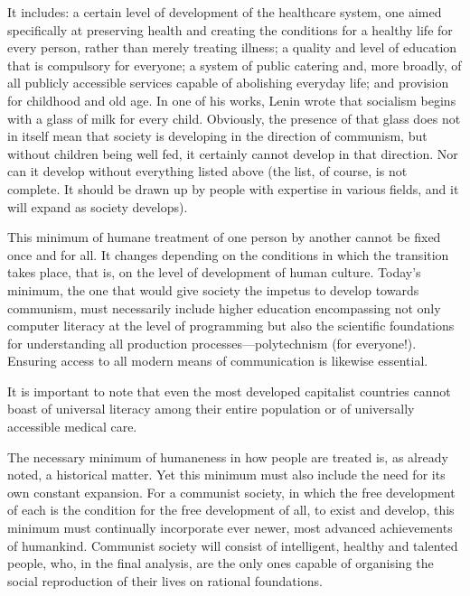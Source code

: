 \documentclass[../main]{subfiles}
\begin{document}
It includes: a certain level of development of the healthcare system, one aimed specifically at preserving health and creating the conditions for a healthy life for every person, rather than merely treating illness; a quality and level of education that is compulsory for everyone; a system of public catering and, more broadly, of all publicly accessible services capable of abolishing everyday life; and provision for childhood and old age. In one of his works, Lenin wrote that socialism begins with a glass of milk for every child. Obviously, the presence of that glass does not in itself mean that society is developing in the direction of communism, but without children being well fed, it certainly cannot develop in that direction. Nor can it develop without everything listed above (the list, of course, is not complete. It should be drawn up by people with expertise in various fields, and it will expand as society develops).

This minimum of humane treatment of one person by another cannot be fixed once and for all. It changes depending on the conditions in which the transition takes place, that is, on the level of development of human culture. Today’s minimum, the one that would give society the impetus to develop towards communism, must necessarily include higher education encompassing not only computer literacy at the level of programming but also the scientific foundations for understanding all production processes—polytechnism (for everyone!). Ensuring access to all modern means of communication is likewise essential.

It is important to note that even the most developed capitalist countries cannot boast of universal literacy among their entire population or of universally accessible medical care.

The necessary minimum of humaneness in how people are treated is, as already noted, a historical matter. Yet this minimum must also include the need for its own constant expansion. For a communist society, in which the free development of each is the condition for the free development of all, to exist and develop, this minimum must continually incorporate ever newer, most advanced achievements of humankind. Communist society will consist of intelligent, healthy and talented people, who, in the final analysis, are the only ones capable of organising the social reproduction of their lives on rational foundations.
\end{document}
